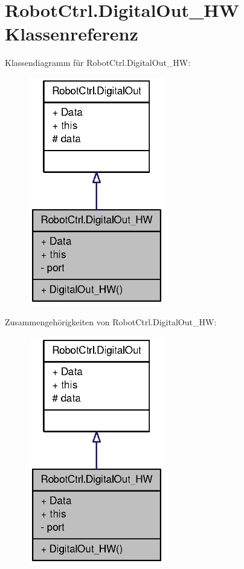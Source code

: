 \hypertarget{class_robot_ctrl_1_1_digital_out___h_w}{
\section{RobotCtrl.DigitalOut\_\-HW Klassenreferenz}
\label{class_robot_ctrl_1_1_digital_out___h_w}
}


Klassendiagramm für RobotCtrl.DigitalOut\_\-HW:\nopagebreak
\begin{figure}[H]
\begin{center}
\leavevmode
\includegraphics[width=168pt]{class_robot_ctrl_1_1_digital_out___h_w__inherit__graph}
\end{center}
\end{figure}


Zusammengehörigkeiten von RobotCtrl.DigitalOut\_\-HW:\nopagebreak
\begin{figure}[H]
\begin{center}
\leavevmode
\includegraphics[width=168pt]{class_robot_ctrl_1_1_digital_out___h_w__coll__graph}
\end{center}
\end{figure}
